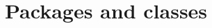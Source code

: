 \documentclass[aspectratio=169]{beamer}
\begin{document}

\section{Packages and classes}
\end{document}
